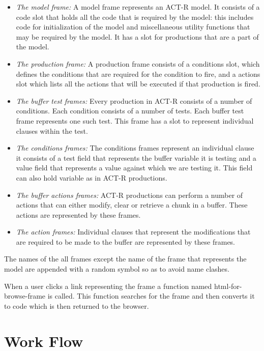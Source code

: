 \begin{itemize}
\item \emph{The model frame:} A model frame represents an ACT-R
  model. It consists of a code slot that holds all the code that is
  required by the model: this includes code for initialization of the
  model and miscellaneous utility functions that may be required by
  the model. It has a slot for productions that are a part of the
  model.
\item \emph{The production frame:} A production frame consists of a
  conditions slot, which defines the conditions that are required for
  the condition to fire, and a actions slot which lists all the
  actions that will be executed if that production is fired.
\item \emph{The buffer test frames:} Every production in ACT-R consists
  of a number of conditions. Each condition consists of a number of
  tests. Each buffer test frame represents one such test. This frame
  has a slot to represent individual clauses within the test.
\item \emph{The conditions frames:} The conditions frames represent an
  individual clause it consists of a test field that represents the
  buffer variable it is testing and a value field that represents a
  value against which we are testing it. This field can also hold
  variable as in ACT-R productions.
\item \emph{The buffer actions frames:} ACT-R productions can perform
  a number of actions that can either modify, clear or retrieve a
  chunk in a buffer. These actions are represented by these frames.
\item \emph{The action frames:} Individual clauses that represent the
  modifications that are required to be made to the buffer are
  represented by these frames.
\end{itemize}

The names of the all frames except the name of the frame that represents
the model are appended with a random symbol so as to avoid name
clashes. 


When a user clicks a link representing the frame a function named
html-for-browse-frame is called. This function searches for the frame
and then converts it to code which is then returned to the browser.


\section{Work Flow}

